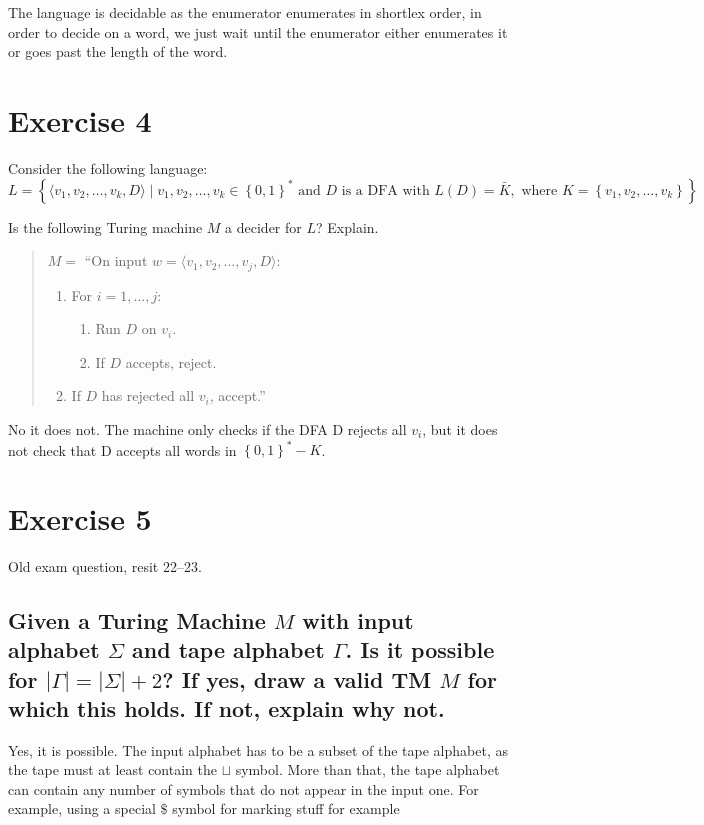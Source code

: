 \documentclass[a4paper,11pt]{article}
\newcommand{\Alphabet}{\Sigma}
\newcommand{\set}[1]{\left\{ #1 \right\}}
\begin{document}
	The language is decidable as the enumerator enumerates in shortlex order, in order to decide on a word, we just wait until the enumerator either enumerates it or goes past the length of the word.

	\section{Exercise 4}
	Consider the following language:
	\[
	L = \set{\langle v_1,v_2,\dots,v_k,D\rangle \mid v_1,v_2,\dots,v_k \in \set{0,1}^* \text{ and $D$ is a DFA with } L(D)=\bar{K},\text{ where }K=\set{v_1,v_2,\dots,v_k}}
	\]

	Is the following Turing machine $M$ a decider for $L$? Explain.

	\begin{quote}
		$M =$ ``On input $w = \langle v_1,v_2,\dots,v_j,D\rangle$:
		\begin{enumerate}[label=\arabic*.]
			\item For $i = 1,\dots,j$:
			\begin{enumerate}[label=\alph*.]
				\item Run $D$ on $v_i$.
				\item If $D$ accepts, reject.
			\end{enumerate}
			\item If $D$ has rejected all $v_i$, accept.''
		\end{enumerate}
	\end{quote}
	No it does not. The machine only checks if the DFA D rejects all $v_i$, but it does not check that D accepts all words in $\set{0,1}^*-K$.

	\section{Exercise 5}
	Old exam question, resit 22--23.

	\subsection{Given a Turing Machine $M$ with input alphabet $\Alphabet$ and tape alphabet $\Gamma$. Is it possible for $|\Gamma| = |\Alphabet| + 2$? If yes, draw a valid TM $M$ for which this holds. If not, explain why not.}
	Yes, it is possible. The input alphabet has to be a subset of the tape alphabet, as the tape must at least contain the $\sqcup$ symbol. More than that, the tape alphabet can contain any number of symbols that do not appear in the input one. For example, using a special $\$$ symbol for marking stuff for example
\end{document}
